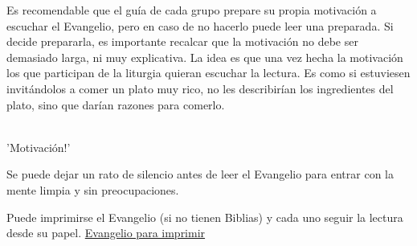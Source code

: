 Es recomendable que el guía de cada grupo prepare su propia motivación a escuchar el Evangelio, pero en caso de no hacerlo puede leer una preparada. Si decide prepararla, es importante recalcar que la motivación no debe ser demasiado larga, ni muy explicativa. La idea es que una vez hecha la motivación los que participan de la liturgia quieran escuchar la lectura. Es como si estuviesen invitándolos a comer un plato muy rico, no les describirían los ingredientes del plato, sino que darían razones para comerlo.

\hfill \\ \hfill
'Motivación!'
\hfill \\ \hfill
    
Se puede dejar un rato de silencio antes de leer el Evangelio para entrar con la mente limpia y sin preocupaciones.
    
Puede imprimirse el Evangelio (si no tienen Biblias) y cada uno seguir la lectura desde su papel. \href{¡link!}{\color{amarillo}Evangelio para imprimir}
\hfill \\ \hfill